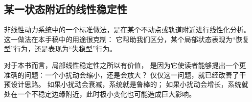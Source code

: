 \subsection{某一状态附近的线性稳定性}

非线性动力系统中的一个标准做法，是在某个不动点或轨道附近进行线性化分析。
这一做法在本手稿中的用途很克制：
它帮助我们区分，某个局部状态表现为“恢复型”行为，还是表现为“失稳型”行为。

\begin{remark}
对于本书而言，局部线性稳定性之所以有价值，
是因为它使读者能够提出一个更准确的问题：一个小扰动会缩小，还是会放大？
仅仅这一问题，就已经改善了干预设计思路。
如果小扰动会衰减，系统就是鲁棒的；
如果小扰动会增长，系统就处在一个不稳定边缘附近，此时极小变化也可能造成巨大影响。
\end{remark}